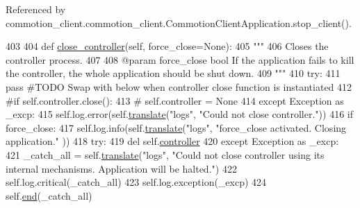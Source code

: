 Referenced by commotion\-\_\-client.\-commotion\-\_\-client.\-Commotion\-Client\-Application.\-stop\-\_\-client().


\begin{DoxyCode}
403 
404     \textcolor{keyword}{def }\hyperlink{classcommotion__client_1_1commotion__client_1_1CommotionClientApplication_aa35cc13c36cfa90d6ac3de6db56e5fc4}{close\_controller}(self, force\_close=None):
405         \textcolor{stringliteral}{"""}
406 \textcolor{stringliteral}{        Closes the controller process.}
407 \textcolor{stringliteral}{}
408 \textcolor{stringliteral}{        @param force\_close bool If the application fails to kill the controller, the whole application
       should be shut down.}
409 \textcolor{stringliteral}{        """}
410         \textcolor{keywordflow}{try}:
411             \textcolor{keywordflow}{pass} \textcolor{comment}{#TODO Swap with below when controller close function is instantiated}
412             \textcolor{comment}{#if self.controller.close():}
413             \textcolor{comment}{#    self.controller = None}
414         \textcolor{keywordflow}{except} Exception \textcolor{keyword}{as} \_excp:
415             self.log.error(self.\hyperlink{classcommotion__client_1_1commotion__client_1_1CommotionClientApplication_a57e951c9b241fb0e0c70055b4ca1b6f7}{translate}(\textcolor{stringliteral}{"logs"}, \textcolor{stringliteral}{"Could not close controller."}))
416             \textcolor{keywordflow}{if} force\_close:
417                 self.log.info(self.\hyperlink{classcommotion__client_1_1commotion__client_1_1CommotionClientApplication_a57e951c9b241fb0e0c70055b4ca1b6f7}{translate}(\textcolor{stringliteral}{"logs"}, \textcolor{stringliteral}{"force\_close activated. Closing application."}
      ))
418                 \textcolor{keywordflow}{try}:
419                     del self.\hyperlink{classcommotion__client_1_1commotion__client_1_1CommotionClientApplication_a2def597b4431ad9a5dbb7ce4339ba0e0}{controller}
420                 \textcolor{keywordflow}{except} Exception \textcolor{keyword}{as} \_excp:
421                     \_catch\_all = self.\hyperlink{classcommotion__client_1_1commotion__client_1_1CommotionClientApplication_a57e951c9b241fb0e0c70055b4ca1b6f7}{translate}(\textcolor{stringliteral}{"logs"}, \textcolor{stringliteral}{"Could not close controller using its
       internal mechanisms. Application will be halted."})
422                     self.log.critical(\_catch\_all)
423                     self.log.exception(\_excp)
424                     self.\hyperlink{classcommotion__client_1_1commotion__client_1_1CommotionClientApplication_af2043aac2ebc25f55b73ec317d6ea463}{end}(\_catch\_all)

\end{DoxyCode}
